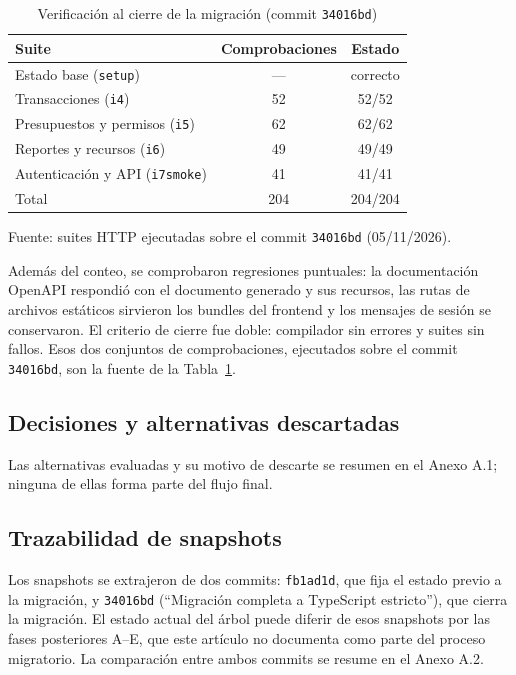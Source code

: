 \documentclass[conference]{IEEEtran}
\begin{document}
\begin{table}[!t]
\caption{Verificación al cierre de la migración (commit \texttt{34016bd})}
\label{tab:verificacion}
\centering
\small
\begin{tabular}{@{}lcc@{}}
\toprule
Suite & Comprobaciones & Estado \\
\midrule
Estado base (\texttt{setup}) & --- & correcto \\
Transacciones (\texttt{i4}) & 52 & 52/52 \\
Presupuestos y permisos (\texttt{i5}) & 62 & 62/62 \\
Reportes y recursos (\texttt{i6}) & 49 & 49/49 \\
Autenticación y API (\texttt{i7smoke}) & 41 & 41/41 \\
\midrule
Total & 204 & 204/204 \\
\bottomrule
\end{tabular}

\vspace{2pt}
{\footnotesize Fuente: suites HTTP ejecutadas sobre el commit
\texttt{34016bd} (05/11/2026).}
\end{table}

Además del conteo, se comprobaron regresiones puntuales: la documentación
OpenAPI respondió con el documento generado y sus recursos, las rutas de
archivos estáticos sirvieron los bundles del frontend y los mensajes de sesión
se conservaron. El criterio de cierre fue doble: compilador sin errores y
suites sin fallos. Esos dos conjuntos de comprobaciones, ejecutados sobre el
commit \texttt{34016bd}, son la fuente de la Tabla~\ref{tab:verificacion}.

\subsection{Decisiones y alternativas descartadas}
Las alternativas evaluadas y su motivo de descarte se resumen en el Anexo A.1;
ninguna de ellas forma parte del flujo final.

\subsection{Trazabilidad de snapshots}
Los snapshots se extrajeron de dos commits: \texttt{fb1ad1d}, que fija el estado
previo a la migración, y \texttt{34016bd} (``Migración completa a TypeScript
estricto''), que cierra la migración. El estado actual del árbol puede diferir
de esos snapshots por las fases posteriores A--E, que este artículo no
documenta como parte del proceso migratorio. La comparación entre ambos commits
se resume en el Anexo A.2.
\end{document}
